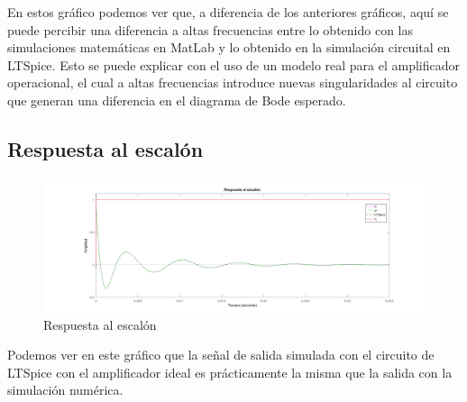 En estos gráfico podemos ver que, a diferencia de los anteriores gráficos, aquí se puede percibir una diferencia a altas frecuencias entre lo obtenido con las simulaciones matemáticas en MatLab y lo obtenido en la simulación circuital en LTSpice. Esto se puede explicar con el uso de un modelo real para el amplificador operacional, el cual a altas frecuencias introduce nuevas singularidades al circuito que generan una diferencia en el diagrama de Bode esperado.

\subsection{Respuesta al escalón}
\begin{figure}[H]
    \centering
    \includegraphics[width=1\textwidth]{resources/Escalon_LTSpice.png}
    \caption{Respuesta al escalón}
\end{figure}

Podemos ver en este gráfico que la señal de salida simulada con el circuito de LTSpice con el amplificador ideal es prácticamente la misma que la salida con la simulación numérica.

